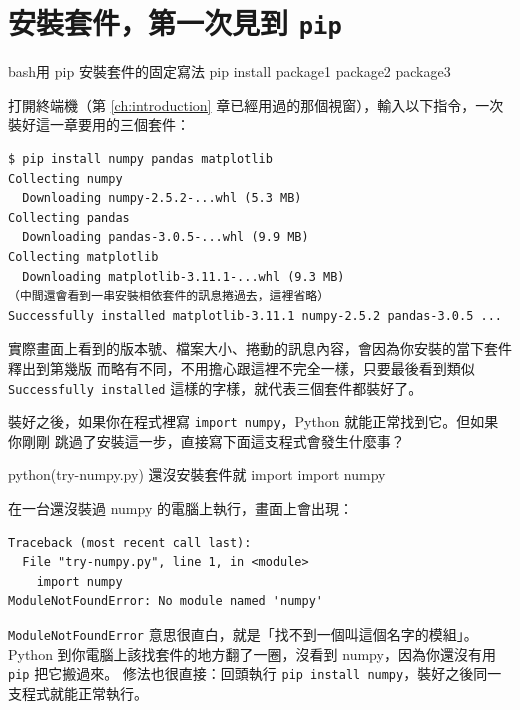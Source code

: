\section{安裝套件，第一次見到 \texttt{pip}}
\label{sec:install-and-pip}

\begin{code}{bash}{用 pip 安裝套件的固定寫法}
pip install package1 package2 package3
\end{code}

打開終端機（第 \ref{ch:introduction} 章已經用過的那個視窗），輸入以下指令，一次裝好這一章要用的三個套件：

\begin{verbatim}
$ pip install numpy pandas matplotlib
Collecting numpy
  Downloading numpy-2.5.2-...whl (5.3 MB)
Collecting pandas
  Downloading pandas-3.0.5-...whl (9.9 MB)
Collecting matplotlib
  Downloading matplotlib-3.11.1-...whl (9.3 MB)
（中間還會看到一串安裝相依套件的訊息捲過去，這裡省略）
Successfully installed matplotlib-3.11.1 numpy-2.5.2 pandas-3.0.5 ...
\end{verbatim}

實際畫面上看到的版本號、檔案大小、捲動的訊息內容，會因為你安裝的當下套件釋出到第幾版
而略有不同，不用擔心跟這裡不完全一樣，只要最後看到類似 \texttt{Successfully installed}
這樣的字樣，就代表三個套件都裝好了。

裝好之後，如果你在程式裡寫 \texttt{import numpy}，Python 就能正常找到它。但如果你剛剛
跳過了安裝這一步，直接寫下面這支程式會發生什麼事？

\begin{example}{python}{(try-numpy.py) 還沒安裝套件就 import}
import numpy
\end{example}

在一台還沒裝過 numpy 的電腦上執行，畫面上會出現：

\begin{verbatim}
Traceback (most recent call last):
  File "try-numpy.py", line 1, in <module>
    import numpy
ModuleNotFoundError: No module named 'numpy'
\end{verbatim}

\texttt{ModuleNotFoundError} 意思很直白，就是「找不到一個叫這個名字的模組」。Python
到你電腦上該找套件的地方翻了一圈，沒看到 numpy，因為你還沒有用 \texttt{pip} 把它搬過來。
修法也很直接：回頭執行 \texttt{pip install numpy}，裝好之後同一支程式就能正常執行。


